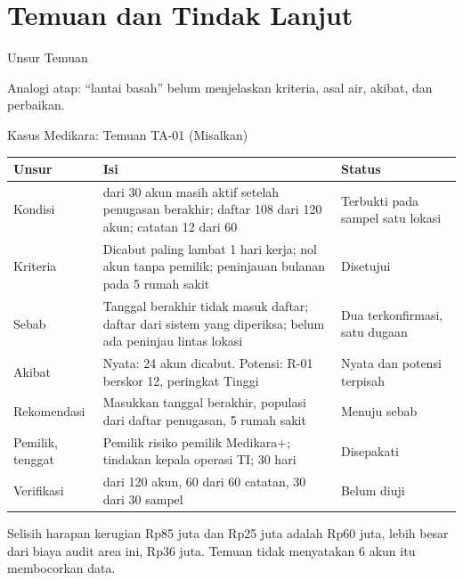 \documentclass[aspectratio=169, table, 12pt]{beamer}
\begin{document}
\section{Temuan dan Tindak Lanjut}

\begin{frame}{{\Large Unsur Temuan}}
  \vspace{8pt}
  \begin{center}
    \resizebox{0.95\textwidth}{!}{}
  \end{center}
  \vspace{4pt}
  \small Analogi atap: ``lantai basah'' belum menjelaskan kriteria, asal air, akibat, dan perbaikan.
\end{frame}

\begin{frame}{{\Large Kasus Medikara: Temuan TA-01 (Misalkan)}}
  \vspace{0pt}
  \scriptsize
  \begin{tabularx}{\textwidth}{|>{\raggedright\arraybackslash}p{}|>{\raggedright\arraybackslash}X|>{\raggedright\arraybackslash}p{}|}
    \hline
    \textbf{Unsur} & \textbf{Isi} & \textbf{Status} \\ \hline
    Kondisi & 6 dari 30 akun masih aktif setelah penugasan berakhir; daftar 108 dari 120 akun;
    catatan 12 dari 60 & Terbukti pada sampel satu lokasi \\ \hline
    Kriteria & Dicabut paling lambat 1 hari kerja; nol akun tanpa pemilik; peninjauan bulanan pada 5
    rumah sakit & Disetujui \\ \hline
    Sebab & Tanggal berakhir tidak masuk daftar; daftar dari sistem yang diperiksa; belum ada
    peninjau lintas lokasi & Dua terkonfirmasi, satu dugaan \\ \hline
    Akibat & Nyata: 24 akun dicabut. Potensi: R-01 berskor 12, peringkat Tinggi & Nyata dan potensi
    terpisah \\ \hline
    Rekomendasi & Masukkan tanggal berakhir, populasi dari daftar penugasan, 5 rumah sakit & Menuju
    sebab \\ \hline
    Pemilik, tenggat & Pemilik risiko pemilik Medikara+; tindakan kepala operasi TI; 30 hari &
    Disepakati \\ \hline
    Verifikasi & 120 dari 120 akun, 60 dari 60 catatan, 30 dari 30 sampel & Belum diuji \\ \hline
  \end{tabularx}

  \vspace{4pt}
  \scriptsize Selisih harapan kerugian Rp85 juta dan Rp25 juta adalah Rp60 juta, lebih besar dari
  biaya audit area ini, Rp36 juta. Temuan tidak menyatakan 6 akun itu membocorkan data.
\end{frame}
\end{document}
